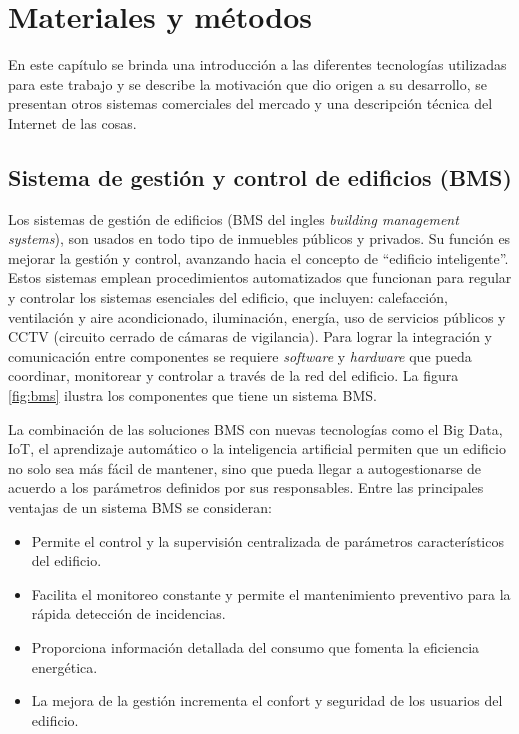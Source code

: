 \chapter{Materiales y métodos} %

\label{Chapter2}

En este capítulo se brinda una introducción a las diferentes tecnologías utilizadas para este trabajo y se describe la motivación que dio origen a su desarrollo, se presentan otros sistemas comerciales del mercado y una descripción técnica del Internet de las cosas.


\section{Sistema de gestión y control de edificios (BMS)}
Los sistemas de gestión de edificios (BMS del ingles \emph{building management systems}), son usados en todo tipo de inmuebles públicos y privados. Su función es mejorar la gestión y control, avanzando hacia el concepto de ``edificio inteligente''. Estos sistemas emplean procedimientos automatizados que funcionan para regular y controlar los sistemas esenciales del edificio, que incluyen: calefacción, ventilación y aire acondicionado, iluminación, energía, uso de servicios públicos y CCTV (circuito cerrado de cámaras de vigilancia). Para lograr la integración y comunicación entre componentes se requiere \emph{software} y \emph{hardware} que pueda coordinar, monitorear y controlar a través de la red del edificio. La figura \ref{fig:bms}  ilustra los componentes que tiene un sistema BMS.

La combinación de las soluciones BMS con nuevas tecnologías como el Big Data, IoT, el aprendizaje automático o la inteligencia artificial permiten que un edificio no solo sea más fácil de mantener, sino que pueda llegar a autogestionarse de acuerdo a los parámetros definidos por sus responsables. Entre las principales ventajas de un sistema BMS se consideran:

\vspace{0.25cm}
\begin{itemize}
\item Permite el control y la supervisión centralizada de parámetros característicos del edificio.
\item Facilita el monitoreo constante y permite el mantenimiento preventivo para la rápida detección de incidencias.
\item Proporciona información detallada del consumo que fomenta la eficiencia energética.
\item La mejora de la gestión incrementa el confort y seguridad de los usuarios del edificio.
\end{itemize} 


